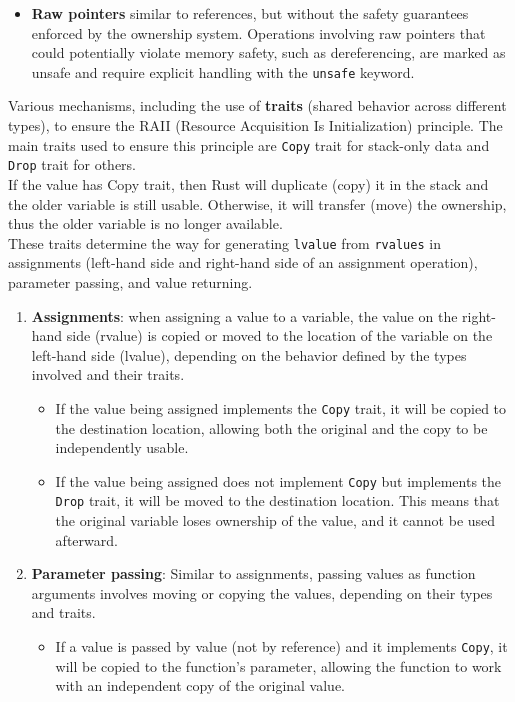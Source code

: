 \documentclass{article}
\begin{document}
\begin{itemize}
\begin{itemize}
        \item \textbf{Raw pointers} similar to references, but without the safety guarantees enforced by the ownership system. Operations involving raw pointers that could potentially violate memory safety, such as dereferencing, are marked as unsafe and require explicit handling with the \texttt{unsafe} keyword.
    \end{itemize}
Various mechanisms, including the use of \textbf{traits} (shared behavior across different types), to ensure the RAII (Resource Acquisition Is Initialization) principle. The main traits used to ensure this principle are \texttt{Copy} trait for stack-only data and \texttt{Drop} trait for others.\\If the value has Copy trait, then Rust will duplicate (copy) it in the stack and the older variable is still usable. Otherwise, it will transfer (move) the ownership, thus the older variable is no longer available.
\\These traits determine the way for generating \texttt{lvalue} from \texttt{rvalues} in assignments (left-hand side and right-hand side of an assignment operation), parameter passing, and value returning.
\begin{enumerate}
    \item \textbf{Assignments}: when assigning a value to a variable, the value on the right-hand side (rvalue) is copied or moved to the location of the variable on the left-hand side (lvalue), depending on the behavior defined by the types involved and their traits.
    \begin{itemize}
        \item If the value being assigned implements the \texttt{Copy} trait, it will be copied to the destination location, allowing both the original and the copy to be independently usable.
        \item If the value being assigned does not implement \texttt{Copy} but implements the \texttt{Drop} trait, it will be moved to the destination location. This means that the original variable loses ownership of the value, and it cannot be used afterward.
    \end{itemize}

    \item \textbf{Parameter passing}: Similar to assignments, passing values as function arguments involves moving or copying the values, depending on their types and traits.
    
    \begin{itemize}
        \item If a value is passed by value (not by reference) and it implements \texttt{Copy}, it will be copied to the function's parameter, allowing the function to work with an independent copy of the original value.
        

\end{itemize}
\end{enumerate}
\end{itemize}
\end{document}
